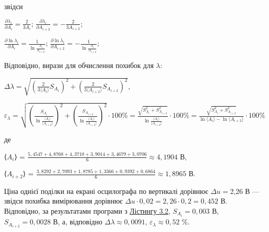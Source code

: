 \documentclass[12pt,a4paper]{article}
\begin{document}
    звідси

    \begin{center}
        $\displaystyle \frac{\partial \lambda_i}{\partial A_i} = \frac{2}{3A_i}$; $\displaystyle \frac{\partial \lambda_i}{\partial A_{i+2}} = -\frac{2}{3A_{i+2}}$;
    \end{center}

    \begin{center}
        $\displaystyle \frac{\partial \ln \lambda_i}{\partial A_i} = \frac{1}{\ln \frac{A_i}{A_{i+2}}}$; $\displaystyle \frac{\partial \ln \lambda_i}{\partial A_{i+2}} = -\frac{1}{\ln \frac{A_i}{A_{i+2}}}$;
    \end{center}

    Відповідно, вирази для обчислення похибок для $\lambda$:

    \begin{center}
        $\displaystyle \Delta \lambda = \sqrt{\left( \frac{2}{3\text{⟨}A_i\text{⟩}} S_{A_i} \right)^2 + \left( \frac{2}{3\text{⟨}A_{i+2}\text{⟩}} S_{A_{i+2}}\right)^2}$,
    \end{center}

    \begin{center}
        $\displaystyle \varepsilon_{\lambda} = \sqrt{\left( \frac{S_{A_i}}{\ln \frac{\text{⟨}A_i\text{⟩}}{\text{⟨}A_{i+2}\text{⟩}}}\right)^2 + \left( \frac{S_{A_{i+2}}}{\ln \frac{\text{⟨}A_i\text{⟩}}{\text{⟨}A_{i+2}\text{⟩}}} \right)^2} \cdot 100 \% =
        \frac{\sqrt{S_{A_i}^2 + S_{A_{i+2}}^2}}{\ln \frac{\text{⟨}A_i\text{⟩}}{\text{⟨}A_{i+2}\text{⟩}}} \cdot 100 \% = \frac{\sqrt{S_{A_i}^2 + S_{A_{i+2}}^2}}{\ln \text{⟨}A_i\text{⟩} - \ln \text{⟨}A_{i+2}\text{⟩}} \cdot 100 \%$
    \end{center}

    де

    \begin{center}
        ⟨$\displaystyle A_i$⟩ = $\displaystyle \frac{5,4547 + 4,8768 + 4,3710 + 3,9014 + 3,4679 + 3,0706}{6} \approx 4,1904$ В,
    \end{center}

    \begin{center}
        ⟨$\displaystyle A_{i+2}$⟩ = $\displaystyle \frac{3,8292 + 2,7093 + 1,8785 + 1,3366 + 0,9392 + 0,6864}{6} \approx 1,8965$ В.
    \end{center}

    Ціна однієї поділки на екрані осцилографа по вертикалі дорівнює $\Delta u = $2,26 В --- звідси похибка вимірювання дорівнює $\Delta u \cdot 0,02 = 2,26 \cdot 0,2 = 0,452$ В.
    Відповідно, за результатами програми з \hyperlink{listing2}{Лістингу 3.2}, $S_{A_i} = 0,003$ В, $S_{A_{i+2}} = 0,0028$ В, а, відповідно $\Delta \lambda \approx 0,0091$, $\varepsilon_{\lambda} \approx 0,52$ \%.
\end{document}
